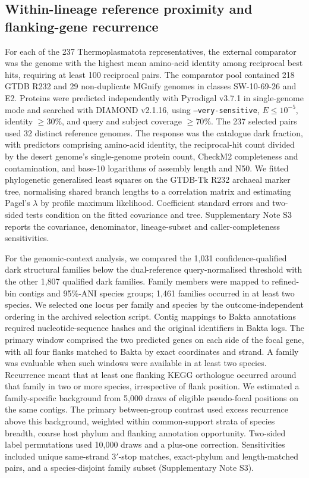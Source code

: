 \subsection*{Within-lineage reference proximity and flanking-gene recurrence}
For each of the 237 Thermoplasmatota representatives, the external comparator was the genome
with the highest mean amino-acid identity among reciprocal best hits, requiring at least 100
reciprocal pairs. The comparator pool contained 218 GTDB R232 and 29 non-duplicate MGnify genomes
in classes SW-10-69-26 and E2. Proteins were predicted independently with Pyrodigal v3.7.1 in
single-genome mode and searched with DIAMOND v2.1.16, using \texttt{--very-sensitive},
$E\leq10^{-5}$, identity $\geq30\%$, and query and subject coverage $\geq70\%$.
The 237 selected pairs used 32 distinct reference genomes. The response was the catalogue dark
fraction, with predictors comprising amino-acid identity, the reciprocal-hit count divided by
the desert genome's single-genome protein count, CheckM2 completeness and contamination, and
base-10 logarithms of assembly length and N50. We fitted phylogenetic generalised least squares
on the GTDB-Tk R232 archaeal marker tree, normalising shared branch lengths to a correlation
matrix and estimating Pagel's $\lambda$ by profile maximum likelihood. Coefficient standard
errors and two-sided tests condition on the fitted covariance and tree. Supplementary Note S3
reports the covariance, denominator, lineage-subset and caller-completeness sensitivities.

For the genomic-context analysis, we compared the 1{,}031 confidence-qualified dark structural
families below the dual-reference query-normalised threshold with the other 1{,}807 qualified
dark families. Family members were mapped to refined-bin contigs and 95\%-ANI species groups;
1{,}461 families occurred in at least two species. We selected one locus per family and species
by the outcome-independent ordering in the archived selection script. Contig mappings to Bakta
annotations required nucleotide-sequence hashes and the original identifiers in Bakta logs.
The primary window comprised the two predicted genes on each side of the focal gene, with all
four flanks matched to Bakta by exact coordinates and strand. A family was evaluable when such
windows were available in at least two species. Recurrence meant that at least one flanking KEGG
orthologue occurred around that family in two or more species, irrespective of flank position.
We estimated a family-specific background from 5{,}000 draws of eligible pseudo-focal positions
on the same contigs. The primary between-group contrast used excess recurrence above this
background, weighted within common-support strata of species breadth, coarse host phylum and
flanking annotation opportunity. Two-sided label permutations used 10{,}000 draws and a plus-one
correction. Sensitivities included unique same-strand 3$'$-stop matches, exact-phylum and
length-matched pairs, and a species-disjoint family subset (Supplementary Note S3).
